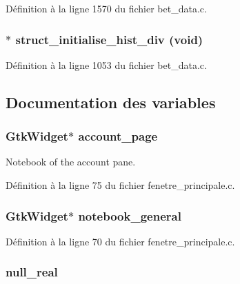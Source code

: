 Définition à la ligne 1570 du fichier bet\_\-data.c.

\subsubsection[{struct\_\-initialise\_\-hist\_\-div}]{$\ast$ struct\_\-initialise\_\-hist\_\-div (void)}\label{bet__data_8c_a02747f493a512f416e05204ef14f6925}


Définition à la ligne 1053 du fichier bet\_\-data.c.



\subsection{Documentation des variables}
\subsubsection[{account\_\-page}]{\setlength{\rightskip}{0pt plus 5cm}GtkWidget$\ast$ {\bf account\_\-page}}\label{bet__data_8c_ad5443d986a9ab5d64dd84c5346c4b87c}
Notebook of the account pane. 

Définition à la ligne 75 du fichier fenetre\_\-principale.c.

\subsubsection[{notebook\_\-general}]{\setlength{\rightskip}{0pt plus 5cm}GtkWidget$\ast$ {\bf notebook\_\-general}}\label{bet__data_8c_a8924516aa4170f932308e93cf93a785b}


Définition à la ligne 70 du fichier fenetre\_\-principale.c.

\subsubsection[{null\_\-real}]{ {\bf null\_\-real}}\label{bet__data_8c_a26f304bec3fdc0651b9aa8765d4de3c6}


